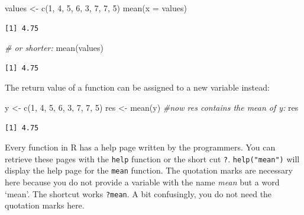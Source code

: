 \documentclass[
]{book}
\newenvironment{Shaded}{\begin{snugshade}}{\end{snugshade}}
\newcommand{\AttributeTok}[1]{\textcolor[rgb]{0.77,0.63,0.00}{#1}}
\newcommand{\CommentTok}[1]{\textcolor[rgb]{0.56,0.35,0.01}{\textit{#1}}}
\newcommand{\DecValTok}[1]{\textcolor[rgb]{0.00,0.00,0.81}{#1}}
\newcommand{\FunctionTok}[1]{\textcolor[rgb]{0.00,0.00,0.00}{#1}}
\newcommand{\NormalTok}[1]{#1}
\newcommand{\OtherTok}[1]{\textcolor[rgb]{0.56,0.35,0.01}{#1}}
\begin{document}
\begin{Shaded}
\begin{Highlighting}[]
\NormalTok{values }\OtherTok{\textless{}{-}} \FunctionTok{c}\NormalTok{(}\DecValTok{1}\NormalTok{, }\DecValTok{4}\NormalTok{, }\DecValTok{5}\NormalTok{, }\DecValTok{6}\NormalTok{, }\DecValTok{3}\NormalTok{, }\DecValTok{7}\NormalTok{, }\DecValTok{7}\NormalTok{, }\DecValTok{5}\NormalTok{)}
\FunctionTok{mean}\NormalTok{(}\AttributeTok{x =}\NormalTok{ values)}
\end{Highlighting}
\end{Shaded}

\begin{verbatim}
[1] 4.75
\end{verbatim}

\begin{Shaded}
\begin{Highlighting}[]
\CommentTok{\# or shorter:}
\FunctionTok{mean}\NormalTok{(values)}
\end{Highlighting}
\end{Shaded}

\begin{verbatim}
[1] 4.75
\end{verbatim}

The return value of a function can be assigned to a new variable instead:

\begin{Shaded}
\begin{Highlighting}[]
\NormalTok{y }\OtherTok{\textless{}{-}} \FunctionTok{c}\NormalTok{(}\DecValTok{1}\NormalTok{, }\DecValTok{4}\NormalTok{, }\DecValTok{5}\NormalTok{, }\DecValTok{6}\NormalTok{, }\DecValTok{3}\NormalTok{, }\DecValTok{7}\NormalTok{, }\DecValTok{7}\NormalTok{, }\DecValTok{5}\NormalTok{)}
\NormalTok{res }\OtherTok{\textless{}{-}} \FunctionTok{mean}\NormalTok{(y)}
\CommentTok{\#now res contains the mean of y:}
\NormalTok{res}
\end{Highlighting}
\end{Shaded}

\begin{verbatim}
[1] 4.75
\end{verbatim}

Every function in R has a help page written by the programmers. You can retrieve these pages with the \texttt{help} function or the short cut \texttt{?}. \texttt{help("mean")} will display the help page for the \texttt{mean} function. The quotation marks are necessary here because you do not provide a variable with the name \emph{mean} but a word `mean'. The shortcut works \texttt{?mean}. A bit confusingly, you do not need the quotation marks here.
\end{document}
